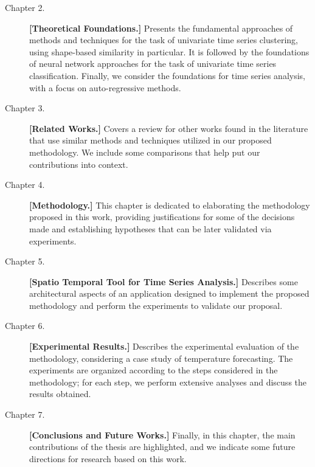 \begin{description}
\item[Chapter 2.] \textbf{[Theoretical Foundations.]} Presents the fundamental approaches of methods and techniques for the task of univariate time series clustering, using shape-based similarity in particular. It is followed by the foundations of neural network approaches for the task of univariate time series classification. Finally, we consider the foundations for time series analysis, with a focus on auto-regressive methods.

\item[Chapter 3.] \textbf{[Related Works.]} Covers a review for other works found in the literature that use similar methods and techniques utilized in our proposed methodology. We include some comparisons that help put our contributions into context. %

\item[Chapter 4.] \textbf{[Methodology.]} This chapter is dedicated to elaborating the methodology proposed in this work, providing justifications for some of the decisions made and establishing hypotheses that can be later validated via experiments.

\item[Chapter 5.] \textbf{[Spatio Temporal Tool for Time Series Analysis.]} Describes some architectural aspects of an application designed to implement the proposed methodology and perform the experiments to validate our proposal.

\item[Chapter 6.] \textbf{[Experimental Results.]} Describes the experimental evaluation of the methodology, considering a case study of temperature forecasting. The experiments are organized according to the steps considered in the methodology; for each step, we perform extensive analyses and discuss the results obtained. 

\item[Chapter 7.] \textbf{[Conclusions and Future Works.]} Finally, in this chapter, the main contributions of the thesis are highlighted, and we indicate some future directions for research based on this work.

\end{description}




